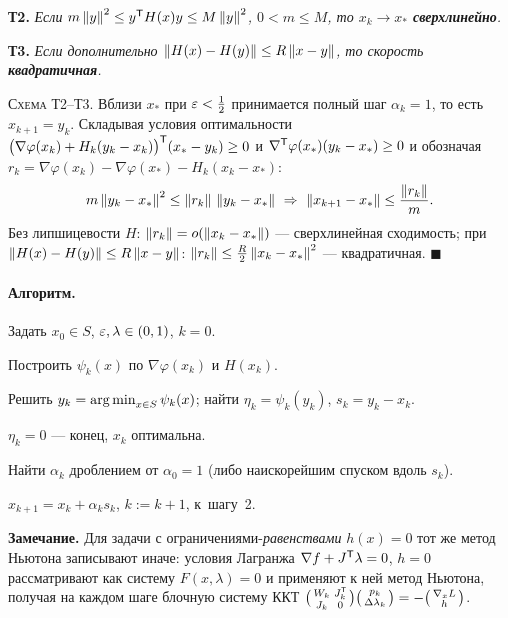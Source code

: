 \textbf{Т2.} \textit{Если $m\left\lVert y \right\rVert^2 \le y^{\mathsf{T}} H(x)y \le M\left\lVert y \right\rVert^2$,
$0 < m \le M$, то $x_k \to x_*$ \textbf{сверхлинейно}.}

\textbf{Т3.} \textit{Если дополнительно $\left\lVert H(x)-H(y) \right\rVert \le R\left\lVert x-y \right\rVert$, то
скорость \textbf{квадратичная}.}

\textsc{Схема Т2--Т3.} Вблизи $x_*$ при $\varepsilon < \tfrac12$ принимается полный шаг
$\alpha_k = 1$, то есть $x_{k+1} = y_k$. Складывая условия оптимальности
$\big(\nabla\varphi(x_k) + H_k(y_k - x_k)\big)^{\mathsf{T}}(x_* - y_k) \ge 0$ и
$\nabla^{\mathsf{T}}\varphi(x_*)(y_k - x_*) \ge 0$ и обозначая
$r_k = \nabla\varphi(x_k) - \nabla\varphi(x_*) - H_k(x_k - x_*)$:
\[
  m\left\lVert y_k - x_* \right\rVert^2 \le \left\lVert r_k \right\rVert\,\left\lVert y_k - x_* \right\rVert
  \ \Rightarrow\ \left\lVert x_{k+1} - x_* \right\rVert \le \frac{\left\lVert r_k \right\rVert}{m} .
\]
Без липшицевости $H$: $\left\lVert r_k \right\rVert = o(\left\lVert x_k - x_* \right\rVert)$ — сверхлинейная
сходимость; при $\left\lVert H(x)-H(y) \right\rVert \le R\left\lVert x-y \right\rVert$:
$\left\lVert r_k \right\rVert \le \tfrac{R}{2}\left\lVert x_k-x_* \right\rVert^2$ — квадратичная. $\blacksquare$

\paragraph{Алгоритм.}
\begin{csteps}
  \item Задать $x_0 \in S$, $\varepsilon, \lambda \in (0,1)$, $k = 0$.
  \item Построить $\psi_k(x)$ по $\nabla\varphi(x_k)$ и $H(x_k)$.
  \item Решить $y_k = \operatorname*{arg\,min}_{x\in S}\psi_k(x)$; найти
        $\eta_k = \psi_k(y_k)$, $s_k = y_k - x_k$.
  \item $\eta_k = 0$ — конец, $x_k$ оптимальна.
  \item Найти $\alpha_k$ дроблением от $\alpha_0 = 1$ (либо наискорейшим
        спуском вдоль $s_k$).
  \item $x_{k+1} = x_k + \alpha_k s_k$, $k := k+1$, к~шагу~2.
\end{csteps}

\textbf{Замечание.} Для задачи с ограничениями-\emph{равенствами} $h(x) = 0$
тот же метод Ньютона записывают иначе: условия Лагранжа
$\nabla f + J^{\mathsf{T}}\lambda = 0$, $h = 0$ рассматривают как систему $F(x,\lambda) = 0$
и применяют к ней метод Ньютона, получая на каждом шаге блочную систему ККТ
$\big(\begin{smallmatrix} W_k & J_k^{\mathsf{T}} \\ J_k & 0\end{smallmatrix}\big)
\big(\begin{smallmatrix} p_k \\ \Delta\lambda_k\end{smallmatrix}\big)
= -\big(\begin{smallmatrix} \nabla_x L \\ h \end{smallmatrix}\big)$.

